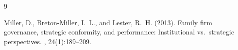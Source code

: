 \documentclass[12pt]{article}
\begin{document}

\begin{thebibliography}{9}

Miller, D., Breton-Miller, I.~L., and Lester, R.~H. (2013).
\newblock Family firm governance, strategic conformity, and performance: Institutional vs.\ strategic perspectives.
, 24(1):189--209.

\end{thebibliography}
\end{document}
